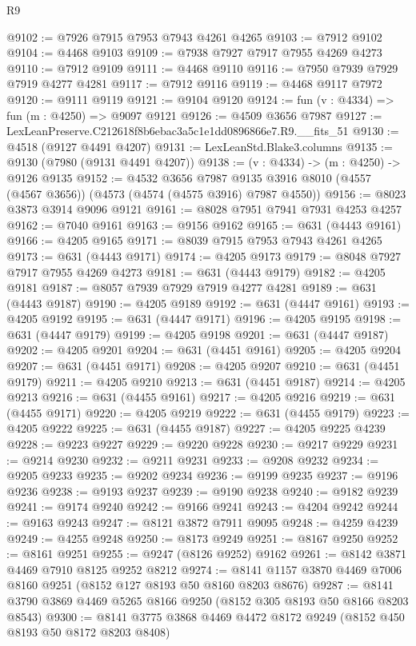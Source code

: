 \begin{lexlean}{R9}
\begin{coremodule}
@9102 := @7926 @7915 @7953 @7943 @4261 @4265
@9103 := @7912 @9102
@9104 := @4468 @9103
@9109 := @7938 @7927 @7917 @7955 @4269 @4273
@9110 := @7912 @9109
@9111 := @4468 @9110
@9116 := @7950 @7939 @7929 @7919 @4277 @4281
@9117 := @7912 @9116
@9119 := @4468 @9117 @7972
@9120 := @9111 @9119
@9121 := @9104 @9120
@9124 := fun (v : @4334) => fun (m : @4250) => @9097 @9121
@9126 := @4509 @3656 @7987
@9127 := LexLeanPreserve.C212618f8b6ebac3a5c1e1dd0896866e7.R9.__fits_51
@9130 := @4518 (@9127 @4491 @4207)
@9131 := LexLeanStd.Blake3.columns
@9135 := @9130 (@7980 (@9131 @4491 @4207))
@9138 := (v : @4334) -> (m : @4250) -> @9126 @9135
@9152 := @4532
    @3656
    @7987
    @9135
    @3916
    @8010
    (@4557 (@4567 @3656))
    (@4573 (@4574 (@4575 @3916) @7987 @4550))
@9156 := @8023 @3873 @3914 @9096 @9121
@9161 := @8028 @7951 @7941 @7931 @4253 @4257
@9162 := @7040 @9161
@9163 := @9156 @9162
@9165 := @631 (@4443 @9161)
@9166 := @4205 @9165
@9171 := @8039 @7915 @7953 @7943 @4261 @4265
@9173 := @631 (@4443 @9171)
@9174 := @4205 @9173
@9179 := @8048 @7927 @7917 @7955 @4269 @4273
@9181 := @631 (@4443 @9179)
@9182 := @4205 @9181
@9187 := @8057 @7939 @7929 @7919 @4277 @4281
@9189 := @631 (@4443 @9187)
@9190 := @4205 @9189
@9192 := @631 (@4447 @9161)
@9193 := @4205 @9192
@9195 := @631 (@4447 @9171)
@9196 := @4205 @9195
@9198 := @631 (@4447 @9179)
@9199 := @4205 @9198
@9201 := @631 (@4447 @9187)
@9202 := @4205 @9201
@9204 := @631 (@4451 @9161)
@9205 := @4205 @9204
@9207 := @631 (@4451 @9171)
@9208 := @4205 @9207
@9210 := @631 (@4451 @9179)
@9211 := @4205 @9210
@9213 := @631 (@4451 @9187)
@9214 := @4205 @9213
@9216 := @631 (@4455 @9161)
@9217 := @4205 @9216
@9219 := @631 (@4455 @9171)
@9220 := @4205 @9219
@9222 := @631 (@4455 @9179)
@9223 := @4205 @9222
@9225 := @631 (@4455 @9187)
@9227 := @4205 @9225 @4239
@9228 := @9223 @9227
@9229 := @9220 @9228
@9230 := @9217 @9229
@9231 := @9214 @9230
@9232 := @9211 @9231
@9233 := @9208 @9232
@9234 := @9205 @9233
@9235 := @9202 @9234
@9236 := @9199 @9235
@9237 := @9196 @9236
@9238 := @9193 @9237
@9239 := @9190 @9238
@9240 := @9182 @9239
@9241 := @9174 @9240
@9242 := @9166 @9241
@9243 := @4204 @9242
@9244 := @9163 @9243
@9247 := @8121 @3872 @7911 @9095
@9248 := @4259 @4239
@9249 := @4255 @9248
@9250 := @8173 @9249
@9251 := @8167 @9250
@9252 := @8161 @9251
@9255 := @9247 (@8126 @9252) @9162
@9261 := @8142 @3871 @4469 @7910 @8125 @9252 @8212
@9274 := @8141 @1157 @3870 @4469 @7006 @8160 @9251 (@8152 @127 @8193 @50 @8160 @8203 @8676)
@9287 := @8141 @3790 @3869 @4469 @5265 @8166 @9250 (@8152 @305 @8193 @50 @8166 @8203 @8543)
@9300 := @8141 @3775 @3868 @4469 @4472 @8172 @9249 (@8152 @450 @8193 @50 @8172 @8203 @8408)

\end{coremodule}
\end{lexlean}

